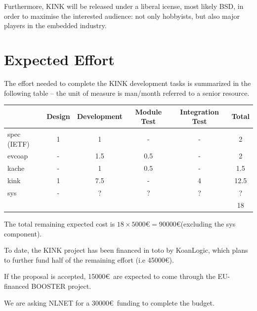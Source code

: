 \documentclass[12pt]{article}
\begin{document}
Furthermore, KINK will be released under a liberal icense, most likely BSD, in order to maximise the interested audience: not only hobbyists, but also major players in the embedded industry.

\section{Expected Effort}
The effort needed to complete the KINK development tasks is summarized in the following table -- the unit of measure is man/month referred to a senior resource.

\begin{center}
\begin{tabular}{|l|c|c|c|c|c|}
	\hline 
	  & Design & Development & Module Test & Integration Test & Total \\
	\hline
	spec (IETF) & 1     & 1     & -     & -     & 2 \\
	\hline 
	evcoap      & -     & 1.5   & 0.5   & -     & 2 \\
	\hline
	kache       & -     & 1     & 0.5   & -     & 1.5 \\
	\hline
	kink        & 1     & 7.5   & -     & 4     & 12.5 \\
	\hline
	sys         & -     & ?     & ?     & ?     & ? \footnotemark \\
	\hline
	\multicolumn{5}{|c|}{} & 18 \\
	\hline
\end{tabular}
\end{center}

The total remaining expected cost is $18 \times 5000$\euro $= 90000$\euro (excluding the sys component).

To date, the KINK project has been financed in toto by KoanLogic, which plans to further fund half of the remaining effort (i.e 45000\euro).

If the proposal is accepted, 15000\euro~are expected to come through the EU-financed BOOSTER project.

We are asking NLNET for a 30000\euro~funding to complete the budget.
\end{document}
